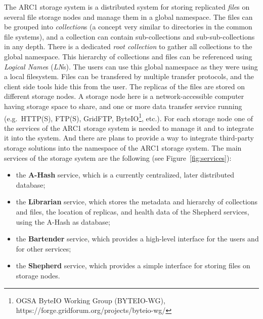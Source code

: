 \documentclass{book}
\begin{document}
The ARC1 storage system is a distributed system for storing replicated \emph{file}s on several file storage nodes and manage them in a global namespace.  The files can be grouped into \emph{collection}s (a concept very similar to directories in the common file systems), and a collection can contain sub-collections and sub-sub-collections in any depth. There is a dedicated \emph{root collection} to gather all collections to the global namespace. This hierarchy of collections and files can be referenced using \emph{Logical Name}s (\emph{LN}s). The users can use this global namespace  as they were using a local filesystem. Files can be transfered by multiple transfer protocols, and the client side tools hide this from the user. The replicas of the files are stored on different storage nodes. A storage node here is a network-accessible computer having storage space to share, and one or more data transfer service running (e.g.~HTTP(S), FTP(S), GridFTP, ByteIO\footnote{OGSA ByteIO Working Group (BYTEIO-WG), https://forge.gridforum.org/projects/byteio-wg/}, etc.). For each storage node one of the services of the ARC1 storage system is needed to manage it and to integrate it into the system. And there are plans to provide a way to integrate third-party storage solutions into the namespace of the ARC1 storage system. The main services of the storage system are the following (see Figure~\ref{fig:services}):
\begin{itemize}
    \item the \textbf{A-Hash} service, which is a currently centralized, later distributed database;
    \item the \textbf{Librarian} service, which stores the metadata and hierarchy of collections and files, the location of replicas, and health data of the Shepherd services, using the A-Hash as database;
    \item the \textbf{Bartender} service, which provides a high-level interface for the users and for other services;
    \item the \textbf{Shepherd} service, which provides a simple interface for storing files on storage nodes.
\end{itemize}
\end{document}
